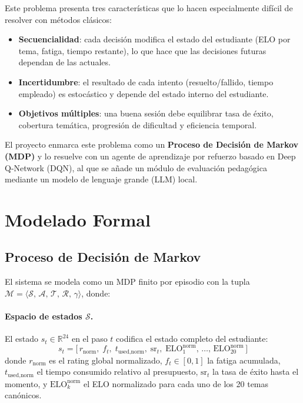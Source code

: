 \documentclass[12pt, a4paper]{article}
\begin{document}
Este problema presenta tres características que lo hacen especialmente difícil
de resolver con métodos clásicos:
 
\begin{itemize}
  \item \textbf{Secuencialidad}: cada decisión modifica el estado del estudiante
    (ELO por tema, fatiga, tiempo restante), lo que hace que las decisiones futuras
    dependan de las actuales.
  \item \textbf{Incertidumbre}: el resultado de cada intento (resuelto/fallido,
    tiempo empleado) es estocástico y depende del estado interno del estudiante.
  \item \textbf{Objetivos múltiples}: una buena sesión debe equilibrar tasa de
    éxito, cobertura temática, progresión de dificultad y eficiencia temporal.
\end{itemize}
 
El proyecto enmarca este problema como un \textbf{Proceso de Decisión de Markov
(MDP)} y lo resuelve con un agente de aprendizaje por refuerzo basado en
Deep Q-Network (DQN), al que se añade un módulo de evaluación pedagógica mediante
un modelo de lenguaje grande (LLM) local.
 
\section{Modelado Formal}
 
\subsection{Proceso de Decisión de Markov}
 
El sistema se modela como un MDP finito por episodio con la tupla
$\mathcal{M} = \langle \mathcal{S},\, \mathcal{A},\, \mathcal{T},\, \mathcal{R},\,
\gamma \rangle$, donde:
 
\paragraph{Espacio de estados $\mathcal{S}$.}
El estado $s_t \in \mathbb{R}^{24}$ en el paso $t$ codifica el estado completo del
estudiante:
\[
  s_t = \bigl[\,r_{\text{norm}},\; f_t,\; t_{\text{used,norm}},\; \text{sr}_t,\;
        \text{ELO}_1^{\text{norm}},\, \ldots,\, \text{ELO}_{20}^{\text{norm}}\,\bigr]
\]
donde $r_{\text{norm}}$ es el rating global normalizado, $f_t \in [0,1]$ la
fatiga acumulada, $t_{\text{used,norm}}$ el tiempo consumido relativo al
presupuesto, $\text{sr}_t$ la tasa de éxito hasta el momento, y
$\text{ELO}_k^{\text{norm}}$ el ELO normalizado para cada uno de los 20 temas
canónicos.
 
\end{document}
